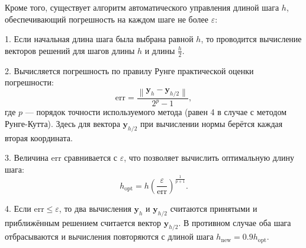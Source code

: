 \documentclass[a4paper, 14pt]{extarticle}
\begin{document}
\begin{justify}
Кроме того, существует алгоритм автоматического управления длиной шага $h$, обеспечивающий погрешность на каждом шаге не более $\varepsilon$:

1. Если начальная длина шага была выбрана равной $h$, то проводится вычисление векторов решений для шагов длины $h$ и длины $\frac{h}{2}$.


2. Вычисляется погрешность по правилу Рунге практической оценки погрешности:
\[
\text{err} = \frac{\left\| \mathbf{y}_h - \mathbf{y}_{h/2} \right\|}{2^p - 1},
\]
где $p$ — порядок точности используемого метода (равен 4 в случае с методом Рунге-Кутта). Здесь для вектора $\mathbf{y}_{h/2}$
при вычислении нормы берётся каждая вторая координата.

3. Величина $\text{err}$ сравнивается с $\varepsilon$, что позволяет вычислить оптимальную длину шага:
\[
h_{\text{opt}} = h \left( \frac{\varepsilon}{\text{err}} \right)^{\frac{1}{p+1}}.
\]

4. Если $\text{err} \le \varepsilon$, то два вычисления $\mathbf{y}_h$ и $\mathbf{y}_{h/2}$ считаются 
принятыми и приближённым решением считается вектор $\mathbf{y}_{h/2}$. В противном случае оба шага отбрасываются 
и вычисления повторяются с длиной шага $h_{\text{new}} = 0.9 h_{\text{opt}}$.

\end{justify}
\pagebreak
\end{document}
